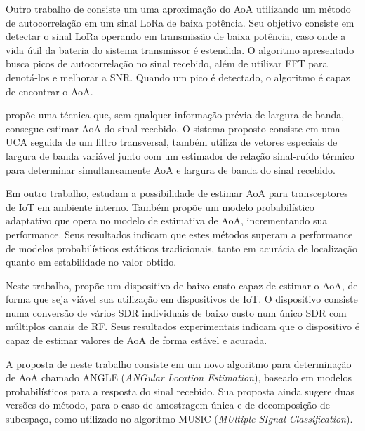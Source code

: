 Outro trabalho de \citeauthor{zeaiter:hal-03932846} \cite{zeaiter:hal-03932846} consiste um uma aproximação do \ac{AoA} utilizando um método de autocorrelação em um sinal \ac{LoRa} de baixa potência.
Seu objetivo consiste em detectar o sinal \ac{LoRa} operando em transmissão de baixa potência, caso onde a vida útil da bateria do sistema transmissor é estendida.
O algoritmo apresentado busca picos de autocorrelação no sinal recebido, além de utilizar \ac{FFT} para denotá-los e melhorar a \ac{SNR}.
Quando um pico é detectado, o algoritmo é capaz de encontrar o \ac{AoA}.


\citeauthor{bnilam20172d} \cite{bnilam20172d} propõe uma técnica que, sem qualquer informação prévia de largura de banda, consegue estimar \ac{AoA} do sinal recebido.
O sistema proposto consiste em uma \ac{UCA} seguida de um filtro transversal, também utiliza de vetores especiais de largura de banda variável junto com um estimador de relação sinal-ruído térmico para determinar simultaneamente \ac{AoA} e largura de banda do sinal recebido.

Em outro trabalho, \citeauthor{bnilam2017adaptive} \cite{bnilam2017adaptive} estudam a possibilidade de estimar \ac{AoA} para transceptores de \ac{IoT} em ambiente interno.
Também propõe um modelo probabilístico adaptativo que opera no modelo de estimativa de \ac{AoA}, incrementando sua performance.
Seus resultados indicam que estes métodos superam a performance de modelos probabilísticos estáticos tradicionais, tanto em acurácia de localização quanto em estabilidade no valor obtido.

Neste trabalho, \citeauthor{bnilam2019low} \cite{bnilam2019low} propõe um dispositivo de baixo custo capaz de estimar o \ac{AoA}, de forma que seja viável sua utilização em dispositivos de \ac{IoT}.
O dispositivo consiste numa conversão de vários \ac{SDR} individuais de baixo custo num único \ac{SDR} com múltiplos canais de \ac{RF}.
Seus resultados experimentais indicam que o dispositivo é capaz de estimar valores de \ac{AoA} de forma estável e acurada.

A proposta de \citeauthor{bnilam2020angle} \cite{bnilam2020angle} neste trabalho consiste em um novo algoritmo para determinação de \ac{AoA} chamado ANGLE (\textit{ANGular Location Estimation}), baseado em modelos probabilísticos para a resposta do sinal recebido.
Sua proposta ainda sugere duas versões do método, para o caso de amostragem única e de decomposição de subespaço, como utilizado no algoritmo MUSIC (\textit{MUltiple SIgnal Classification}).

